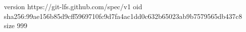version https://git-lfs.github.com/spec/v1
oid sha256:99ae156b85d9cff5969710fc9d7fa4ac1dd0c632b65023ab9b7579565db437c8
size 999
